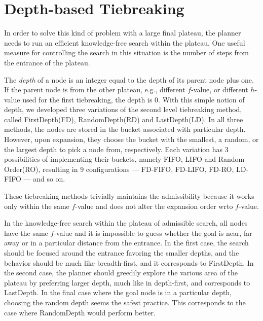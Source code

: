 \section{Depth-based Tiebreaking}

In order to solve this kind of problem with a large final plateau, the
planner needs to run an efficient knowledge-free search within the
plateau.  One useful measure for controlling the search in this
situation is the number of steps from the entrance of the plateau.

The \emph{depth} of a node is an integer equal to the depth of its
parent node plus one. If the parent node is from the other plateau,
e.g., different $f$-value, or different $h$-value used for the first
tiebreaking, the depth is 0.  With this simple notion of depth, we
developed three variations of the second level tiebreaking method,
called FirstDepth(FD), RandomDepth(RD) and LastDepth(LD). In all three
methods, the nodes are stored in the bucket associated with particular
depth.  However, upon expansion, they choose the bucket with the smallest,
a random, or the largest depth to pick a node from, respectively.
Each variation has 3 possibilities of implementing their buckets, namely
FIFO, LIFO and Random Order(RO), resulting in 9 configurations ---
FD-FIFO, FD-LIFO, FD-RO, LD-FIFO --- and so on.

These tiebreaking methods trivially maintains the admissibility because
it works only within the same $f$-value and does not alter the expansion
order wrto $f$-value.

In the knowledge-free search within the
plateau of admissible search, all nodes have the same $f$-value and it
is impossible to guess whether the goal is near, far away or in a
particular distance from the entrance. In the first case, the search
should be focused around the entrance favoring the smaller depths, and
the behavior should be much like breadth-first, and it corresponds to
FirstDepth. In the second case, the planner should greedily explore the
various area of the plateau by preferring larger depth, much like in
depth-first, and corresponds to LastDepth. In the final case where the
goal node is in a particular depth, choosing the random depth seems the
safest practice. This corresponds to the case where RandomDepth would
perform better.


